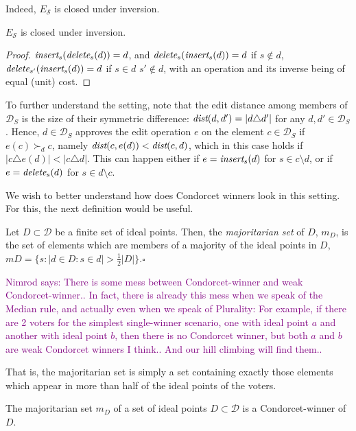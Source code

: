 \documentclass[sigconf]{aamas}  %
\newcommand{\nimrod}[1]{\textcolor{purple}{Nimrod says: #1}}
\newcommand{\qqed}{\hfill$\square$}
\newcommand{\calD}{\mathcal{D}}
\newcommand{\calS}{\mathcal{S}}
\newcommand{\iinsert}[1]{\emph{insert}_{#1}}
\newcommand{\ddelete}[1]{\emph{delete}_{#1}}
\newcommand{\prefers}[1]{\succ_{#1}}
\newcommand{\dist}{\emph{dist}}
\begin{document}
Indeed, $E_\calS$ is closed under inversion.

\begin{lemma}
  $E_\calS$ is closed under inversion.
\end{lemma}

\begin{proof}
%
$\iinsert{s}(\ddelete{s}(d)) = d$, and $\ddelete{s}(\iinsert{s}(d)) = d$ if $s \notin d$, $\ddelete{{s'}}(\iinsert{s}(d)) = d$ if $s \in d$ $s' \notin d$, with an operation and its inverse being of equal (unit) cost.  
%
\end{proof}

To further understand the setting, note that the edit distance among members of $\calD_S$ is the size of their symmetric difference:  $\dist(d,d') = |d \triangle d'|$ for any $d, d' \in \calD_S$. Hence,
$d \in \calD_S$ approves the edit operation $e$ on the element $c \in \calD_S$ if $e(c) \prefers{d} c$, namely  $\dist(c, e(d)) < \dist(c, d)$, which in this case holds if $|c \triangle e(d)| < |c \triangle d|$.  This can happen either if $e = \iinsert{s}(d)$ for $s  \in c \setminus d$, or if $e = \ddelete{s}(d)$ for $s  \in d \setminus c$. 

We wish to better understand how does Condorcet winners look in this setting. For this, the next definition would be useful.

\begin{definition}\label{definition:majoritatian-set}
%
Let $D \subset \calD$ be a finite set of ideal points. Then, the \emph{majoritarian set} of $D$, $m_D$, is the set of elements which are members of a majority of the ideal points in $D$, $mD = \{s: |d \in D : s \in d| > \frac{1}{2}{|D|}\}$.\qqed
%
\end{definition}

\nimrod{There is some mess between Condorcet-winner and weak Condorcet-winner.. In fact, there is already this mess when we speak of the Median rule, and actually even when we speak of Plurality:
  For example, if there are 2 voters for the simplest single-winner scenario, one with ideal point $a$ and another with ideal point $b$, then there is no Condorcet winner, but both $a$ and $b$ are weak Condorcet winners I think.. And our hill climbing will find them..}

That is, the majoritarian set is simply a set containing exactly those elements which appear in more than half of the ideal points of the voters.

\begin{lemma}
\label{lemma:condorcet-majoritarian}
The majoritarian set $m_D$ of a set of ideal points $D \subset \calD$ is a Condorcet-winner of $D$.
\end{lemma}
\end{document}
